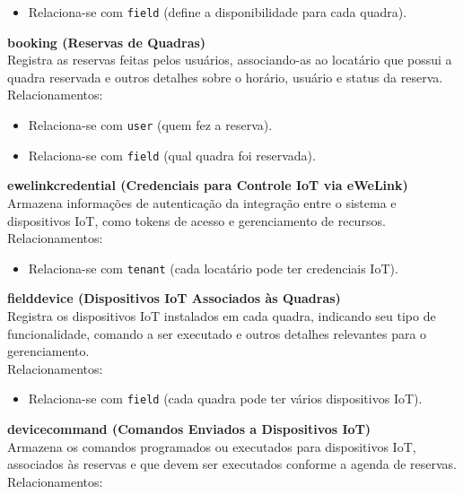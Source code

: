 \begin{itemize} 
	\item Relaciona-se com \texttt{field} (define a disponibilidade para cada quadra). 
\end{itemize}


\textbf{booking (Reservas de Quadras)}\\
Registra as reservas feitas pelos usuários, associando-as ao locatário que possui a quadra reservada e outros detalhes sobre o horário, usuário e status da reserva. \\
Relacionamentos: 

\begin{itemize} 
	\item Relaciona-se com \texttt{user} (quem fez a reserva). 
	\item Relaciona-se com \texttt{field} (qual quadra foi reservada). 
\end{itemize}


\textbf{ewelink\textunderscore credential (Credenciais para Controle IoT via eWeLink)}\\
Armazena informações de autenticação da integração entre o sistema e dispositivos IoT, como tokens de acesso e gerenciamento de recursos. \\
Relacionamentos: 

\begin{itemize} 
	\item Relaciona-se com \texttt{tenant} (cada locatário pode ter credenciais IoT). 
\end{itemize}


\textbf{field\textunderscore device (Dispositivos IoT Associados às Quadras)}\\
Registra os dispositivos IoT instalados em cada quadra, indicando seu tipo de funcionalidade, comando a ser executado e outros detalhes relevantes para o gerenciamento. \\
Relacionamentos: 

\begin{itemize} 
	\item Relaciona-se com \texttt{field} (cada quadra pode ter vários dispositivos IoT). 
\end{itemize}


\textbf{device\textunderscore command (Comandos Enviados a Dispositivos IoT)}\\
Armazena os comandos programados ou executados para dispositivos IoT, associados às reservas e que devem ser executados conforme a agenda de reservas. \\
Relacionamentos: 

